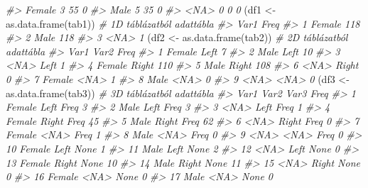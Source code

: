 \documentclass[
]{book}
\newenvironment{Shaded}{\begin{snugshade}}{\end{snugshade}}
\newcommand{\CommentTok}[1]{\textcolor[rgb]{0.56,0.35,0.01}{\textit{#1}}}
\newcommand{\FunctionTok}[1]{\textcolor[rgb]{0.00,0.00,0.00}{#1}}
\newcommand{\NormalTok}[1]{#1}
\newcommand{\OtherTok}[1]{\textcolor[rgb]{0.56,0.35,0.01}{#1}}
\begin{document}
\begin{Shaded}
\begin{Highlighting}[]
\CommentTok{\#\textgreater{}   Female    3    55    0}
\CommentTok{\#\textgreater{}   Male      5    35    0}
\CommentTok{\#\textgreater{}   \textless{}NA\textgreater{}      0     0    0}
\NormalTok{(df1 }\OtherTok{\textless{}{-}} \FunctionTok{as.data.frame}\NormalTok{(tab1))  }\CommentTok{\# 1D táblázatból adattábla}
\CommentTok{\#\textgreater{}     Var1 Freq}
\CommentTok{\#\textgreater{} 1 Female  118}
\CommentTok{\#\textgreater{} 2   Male  118}
\CommentTok{\#\textgreater{} 3   \textless{}NA\textgreater{}    1}
\NormalTok{(df2 }\OtherTok{\textless{}{-}} \FunctionTok{as.data.frame}\NormalTok{(tab2))  }\CommentTok{\# 2D táblázatból adattábla}
\CommentTok{\#\textgreater{}     Var1  Var2 Freq}
\CommentTok{\#\textgreater{} 1 Female  Left    7}
\CommentTok{\#\textgreater{} 2   Male  Left   10}
\CommentTok{\#\textgreater{} 3   \textless{}NA\textgreater{}  Left    1}
\CommentTok{\#\textgreater{} 4 Female Right  110}
\CommentTok{\#\textgreater{} 5   Male Right  108}
\CommentTok{\#\textgreater{} 6   \textless{}NA\textgreater{} Right    0}
\CommentTok{\#\textgreater{} 7 Female  \textless{}NA\textgreater{}    1}
\CommentTok{\#\textgreater{} 8   Male  \textless{}NA\textgreater{}    0}
\CommentTok{\#\textgreater{} 9   \textless{}NA\textgreater{}  \textless{}NA\textgreater{}    0}
\NormalTok{(df3 }\OtherTok{\textless{}{-}} \FunctionTok{as.data.frame}\NormalTok{(tab3))  }\CommentTok{\# 3D táblázatból adattábla}
\CommentTok{\#\textgreater{}      Var1  Var2 Var3 Freq}
\CommentTok{\#\textgreater{} 1  Female  Left Freq    3}
\CommentTok{\#\textgreater{} 2    Male  Left Freq    3}
\CommentTok{\#\textgreater{} 3    \textless{}NA\textgreater{}  Left Freq    1}
\CommentTok{\#\textgreater{} 4  Female Right Freq   45}
\CommentTok{\#\textgreater{} 5    Male Right Freq   62}
\CommentTok{\#\textgreater{} 6    \textless{}NA\textgreater{} Right Freq    0}
\CommentTok{\#\textgreater{} 7  Female  \textless{}NA\textgreater{} Freq    1}
\CommentTok{\#\textgreater{} 8    Male  \textless{}NA\textgreater{} Freq    0}
\CommentTok{\#\textgreater{} 9    \textless{}NA\textgreater{}  \textless{}NA\textgreater{} Freq    0}
\CommentTok{\#\textgreater{} 10 Female  Left None    1}
\CommentTok{\#\textgreater{} 11   Male  Left None    2}
\CommentTok{\#\textgreater{} 12   \textless{}NA\textgreater{}  Left None    0}
\CommentTok{\#\textgreater{} 13 Female Right None   10}
\CommentTok{\#\textgreater{} 14   Male Right None   11}
\CommentTok{\#\textgreater{} 15   \textless{}NA\textgreater{} Right None    0}
\CommentTok{\#\textgreater{} 16 Female  \textless{}NA\textgreater{} None    0}
\CommentTok{\#\textgreater{} 17   Male  \textless{}NA\textgreater{} None    0}

\end{Highlighting}
\end{Shaded}
\end{document}
